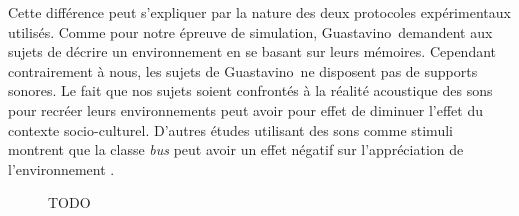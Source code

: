 Cette différence peut s'expliquer par la nature des deux protocoles expérimentaux utilisés. Comme pour notre épreuve de simulation, Guastavino~\al demandent aux sujets de décrire un environnement en se basant sur leurs mémoires. Cependant contrairement à nous, les sujets de Guastavino~\al ne disposent pas de supports sonores. Le fait que nos sujets soient confrontés à la réalité acoustique des sons pour recréer leurs environnements peut avoir pour effet de diminuer l'effet du contexte socio-culturel. D'autres études utilisant des sons comme stimuli montrent que la classe \emph{bus} peut avoir un effet négatif sur l'appréciation de l'environnement \citep{lavandier2006contribution}.

\begin{figure}[t]
        \myfloatalign
         \par
       \caption[TODO]{TODO}\label{fig:soundsource}
\end{figure}

